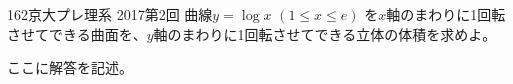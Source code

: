 \begin{thm}{162}{}{京大プレ理系 2017第2回}
 曲線$y=\log x$ $(1\le x \le e)$ を$x$軸のまわりに1回転させてできる曲面を、$y$軸のまわりに1回転させてできる立体の体積を求めよ。
\end{thm}

ここに解答を記述。